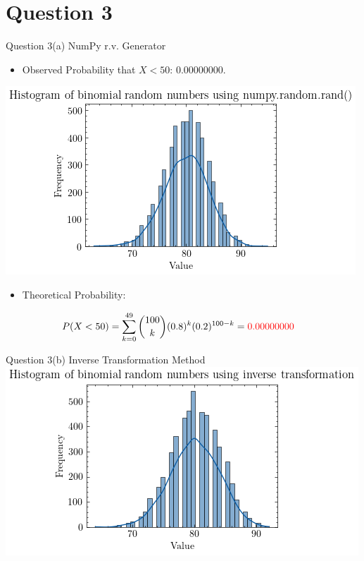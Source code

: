 \documentclass[compress,12pt]{beamer}
\begin{document}
\section{Question 3}
\begin{frame}{Question 3(a) NumPy r.v. Generator}
     \begin{itemize}
         \item Observed Probability that $X < 50$: $0.00000000$.
     \end{itemize}
     \centering
     \includegraphics[scale=0.7]{imgs/binomialrv.png}
     \begin{itemize}
         \item Theoretical Probability:
     \end{itemize}
        \begin{align*}
                P(X < 50) &= \sum_{k=0}^{49} {100 \choose k} (0.8)^k (0.2)^{100-k} = {\color{red}0.00000000}
        \end{align*}
      
\end{frame}

\begin{frame}{Question 3(b) Inverse Transformation Method}
\centering
\includegraphics[scale=0.7]{imgs/binomialinverse.png}  \\
\end{frame}
\end{document}
